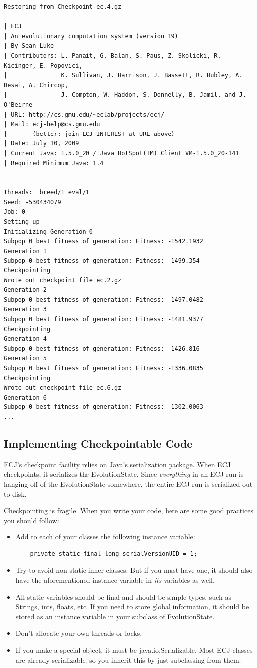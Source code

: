 \documentclass[twoside,10pt]{book}
\newcommand\class[1]{\index{#1}\textsf{#1}}
\begin{document}
{\small\begin{verbatim}
Restoring from Checkpoint ec.4.gz

| ECJ
| An evolutionary computation system (version 19)
| By Sean Luke
| Contributors: L. Panait, G. Balan, S. Paus, Z. Skolicki, R. Kicinger, E. Popovici,
|               K. Sullivan, J. Harrison, J. Bassett, R. Hubley, A. Desai, A. Chircop,
|               J. Compton, W. Haddon, S. Donnelly, B. Jamil, and J. O'Beirne
| URL: http://cs.gmu.edu/~eclab/projects/ecj/
| Mail: ecj-help@cs.gmu.edu
|       (better: join ECJ-INTEREST at URL above)
| Date: July 10, 2009
| Current Java: 1.5.0_20 / Java HotSpot(TM) Client VM-1.5.0_20-141
| Required Minimum Java: 1.4


Threads:  breed/1 eval/1
Seed: -530434079 
Job: 0
Setting up
Initializing Generation 0
Subpop 0 best fitness of generation: Fitness: -1542.1932
Generation 1
Subpop 0 best fitness of generation: Fitness: -1499.354
Checkpointing
Wrote out checkpoint file ec.2.gz
Generation 2
Subpop 0 best fitness of generation: Fitness: -1497.0482
Generation 3
Subpop 0 best fitness of generation: Fitness: -1481.9377
Checkpointing
Generation 4
Subpop 0 best fitness of generation: Fitness: -1426.816
Generation 5
Subpop 0 best fitness of generation: Fitness: -1336.0835
Checkpointing
Wrote out checkpoint file ec.6.gz
Generation 6
Subpop 0 best fitness of generation: Fitness: -1302.0063
...
\end{verbatim}
}

\subsection{Implementing Checkpointable Code}

ECJ's checkpoint facility relies on Java's serialization package.  When ECJ checkpoints, it serializes the EvolutionState.  Since {\it everything} in an ECJ run is hanging off of the EvolutionState somewhere, the entire ECJ run is serialized out to disk.

Checkpointing is fragile.  When you write your code, here are some good practices you should follow:

\begin{itemize}
\item Add to each of your classes the following instance variable:
\begin{verbatim}
    private static final long serialVersionUID = 1;
\end{verbatim}
\item Try to avoid non-static inner classes.  But if you must have one, it should also have the aforementioned instance variable in {\it its} variables as well.
\item All static variables should be final and should be simple types, such as Strings, ints, floats, etc.  If you need to store global information, it should be stored as an instance variable in your subclass of EvolutionState.
\item Don't allocate your own threads or locks.
\item If you make a special object, it must be \class{java.io.Serializable}.  Most ECJ classes are already serializable, so you inherit this by just subclassing from them.
\end{itemize}
\end{document}
